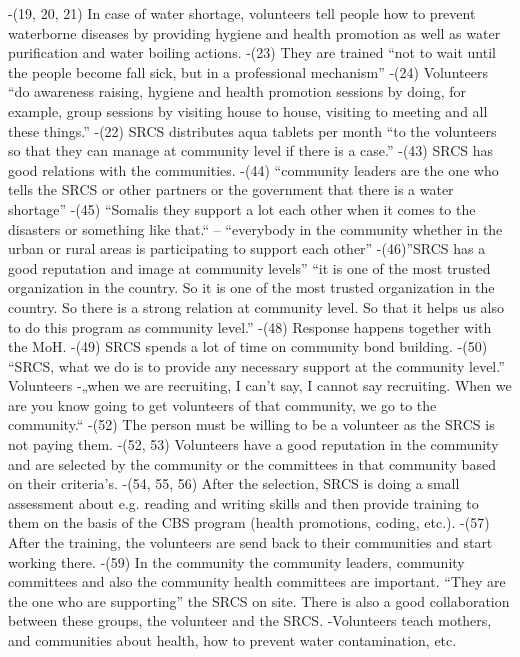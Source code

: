 -(19, 20, 21) In case of water shortage, volunteers tell people how to prevent waterborne diseases by providing hygiene and health promotion as well as water purification and water boiling actions.
-(23) They are trained “not to wait until the people become fall sick, but in a professional mechanism”
-(24) Volunteers “do awareness raising, hygiene and health promotion sessions by doing, for example, group sessions by visiting house to house, visiting to meeting and all these things.”
-(22) SRCS distributes aqua tablets per month “to the volunteers so that they can manage at community level if there is a case.”
-(43) SRCS has good relations with the communities.
-(44) “community leaders are the one who tells the SRCS or other partners or the government that there is a water shortage”
-(45) “Somalis they support a lot each other when it comes to the disasters or something like that.“ – “everybody in the community whether in the urban or rural areas is participating to support each other”
-(46)”SRCS has a good reputation and image at community levels” “it is one of the most trusted organization in the country. So it is one of the most trusted organization in the country. So there is a strong relation at community level. So that it helps us also to do this program as community level.”
-(48) Response happens together with the MoH.
-(49) SRCS spends a lot of time on community bond building.
-(50) “SRCS, what we do is to provide any necessary support at the community level.”
Volunteers
-„when we are recruiting, I can't say, I cannot say recruiting. When we are you know going to get volunteers of that community, we go to the community.“
-(52) The person must be willing to be a volunteer as the SRCS is not paying them.
-(52, 53) Volunteers have a good reputation in the community and are selected by the community or the committees in that community based on their criteria’s.
-(54, 55, 56) After the selection, SRCS is doing a small assessment about e.g. reading and writing skills and then provide training to them on the basis of the CBS program (health promotions, coding, etc.).
-(57) After the training, the volunteers are send back to their communities and start working there.
-(59) In the community the community leaders, community committees and also the community health committees are important. “They are the one who are supporting” the SRCS on site. There is also a good collaboration between these groups, the volunteer and the SRCS.
-Volunteers teach mothers, and communities about health, how to prevent water contamination, etc.

